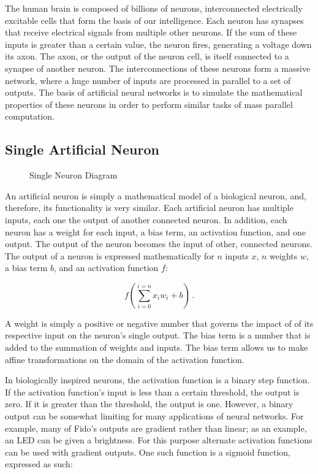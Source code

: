 The human brain is composed of billions of neurons, interconnected electrically excitable cells that form the basis of our intelligence. Each neuron has synapses that receive electrical signals from multiple other neurons. If the sum of these inputs is greater than a certain value, the neuron fires, generating a voltage down its axon. The axon, or the output of the neuron cell, is itself connected to a synapse of another neuron. The interconnections of these neurons form a massive network, where a huge number of inputs are processed in parallel to a set of outputs. The basis of artificial neural networks is to simulate the mathematical properties of these neurons in order to perform similar tasks of mass parallel computation.


\subsection{Single Artificial Neuron}


\begin{figure}[ht]
	\centering
	
	\caption{Single Neuron Diagram}
\end{figure}

An artificial neuron is simply a mathematical model of a biological neuron, and, therefore, its functionality is very similar. Each artificial neuron has multiple inputs, each one the output of another connected neuron. In addition, each neuron has a weight for each input, a bias term, an activation function, and one output. The output of the neuron becomes the input of other, connected neurons. The output of a neuron is expressed mathematically for $n$ inputs $x$, $n$ weights $w$, a bias term $b$, and an activation function $f$:

\begin{equation}
	f(\sum_{i=0}^{i=n}x_i w_i + b)
	\,.
\end{equation}

A weight is simply a positive or negative number that governs the impact of of its respective input on the neuron's single output. The bias term is a number that is added to the summation of weights and inputs. The bias term allows us to make affine transformations on the domain of the activation function. 

In biologically inspired neurons, the activation function is a binary step function. If the activation function's input is less than a certain threshold, the output is zero. If it is greater than the threshold, the output is one. However, a binary output can be somewhat limiting for many applications of neural networks. For example, many of Fido's outputs are gradient rather than linear; as an example, an LED can be given a brightness. For this purpose alternate activation functions can be used with gradient outputs. One such function is a sigmoid function, expressed as such:

